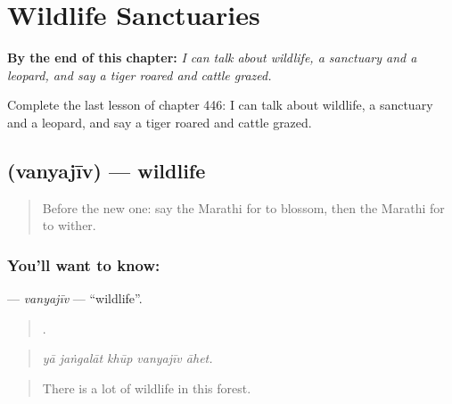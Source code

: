 
\chapter{Wildlife Sanctuaries}
\label{ch:mr-wildlife-sanctuaries}

\begin{chapteropening}
\textbf{By the end of this chapter:} \emph{I can talk about wildlife, a sanctuary and a leopard, and say a tiger roared and cattle grazed.}

Complete the last lesson of chapter 446: I can talk about wildlife, a sanctuary and a leopard, and say a tiger roared and cattle grazed.
\end{chapteropening}

\section[\texorpdfstring{\mr{वन्यजीव} (vanyajīv)}{वन्यजीव (vanyajīv)}]{ (vanyajīv) — wildlife}

\label{lesson:MR-C446-vanyajiv}



\begin{quote}
Before the new one: say the Marathi for to blossom, then the Marathi for to wither.
\end{quote}

\subsection*{You'll want to know: }
\textbf{} — \emph{vanyajīv} — \textquotedblleft{}wildlife\textquotedblright{}.

\begin{quote}
    .
\end{quote}

\begin{quote}
\emph{yā jaṅgalāt khūp vanyajīv āhet.}
\end{quote}

\begin{quote}
There is a lot of wildlife in this forest.
\end{quote}

